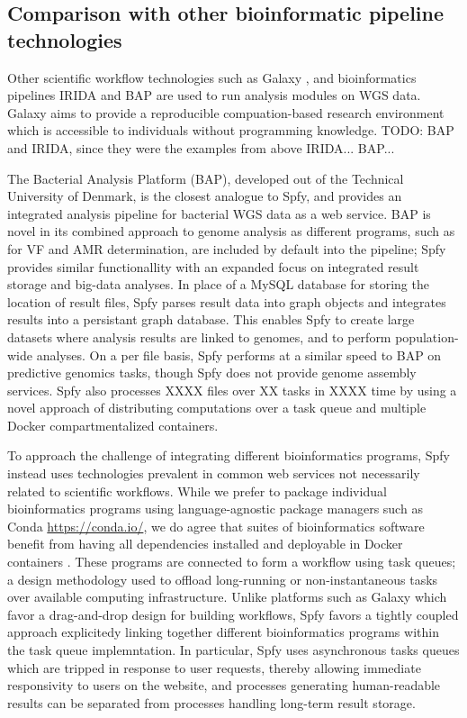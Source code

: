 \documentclass[a4,center,fleqn]{NAR}
\begin{document}
\subsection{Comparison with other bioinformatic pipeline technologies}

Other scientific workflow technologies such as Galaxy \cite{goecks2010galaxy}, and bioinformatics pipelines IRIDA and BAP are used to run analysis modules on WGS data.
Galaxy aims to provide a reproducible compuation-based research environment which is accessible to individuals without programming knowledge.
TODO: BAP and IRIDA, since they were the examples from above
IRIDA...
BAP...

The Bacterial Analysis Platform (BAP), developed out of the Technical University of Denmark, is the closest analogue to Spfy, and provides an integrated analysis pipeline for bacterial WGS data as a web service.
BAP is novel in its combined approach to genome analysis as different programs, such as for VF and AMR determination, are included by default into the pipeline; Spfy provides similar functionallity with an expanded focus on integrated result storage and big-data analyses.
In place of a MySQL database for storing the location of result files, Spfy parses result data into graph objects and integrates results into a persistant graph database.
This enables Spfy to create large datasets where analysis results are linked to genomes, and to perform population-wide analyses.
On a per file basis, Spfy performs at a similar speed to BAP on predictive genomics tasks, though Spfy does not provide genome assembly services.
Spfy also processes XXXX files over XX tasks in XXXX time by using a novel approach of distributing computations over a task queue and multiple Docker compartmentalized containers.

To approach the challenge of integrating different bioinformatics programs, Spfy instead uses technologies prevalent in common web services not necessarily related to scientific workflows.
While we prefer to package individual bioinformatics programs using language-agnostic package managers such as Conda \url{https://conda.io/}, we do agree that suites of bioinformatics software benefit from having all dependencies installed and deployable in Docker containers \cite{di2015impact}.
These programs are connected to form a workflow using task queues; a design methodology used to offload long-running or non-instantaneous tasks over available computing infrastructure.
Unlike platforms such as Galaxy which favor a drag-and-drop design for building workflows, Spfy favors a tightly coupled approach explicitedy linking together different bioinformatics programs within the task queue implemntation.
In particular, Spfy uses asynchronous tasks queues which are tripped in response to user requests, thereby allowing immediate responsivity to users on the website, and processes generating human-readable results can be separated from processes handling long-term result storage.
\end{document}

